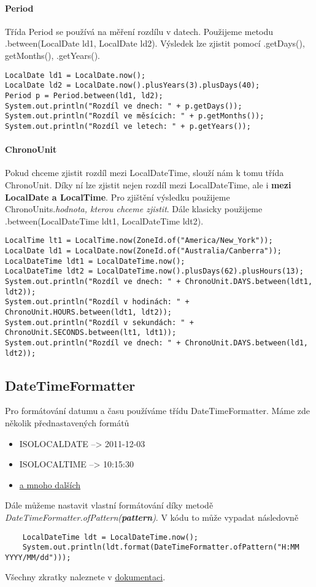 \documentclass[11pt,a4paper,titlepage]{article}
\begin{document}
\paragraph{Period}
Třída Period se používá na měření rozdílu v datech. Použijeme metodu .between(LocalDate ld1, LocalDate ld2). Výsledek lze zjistit pomocí .getDays(), getMonths(), .getYears(). \parencite{java8_period}
\begin{verbatim}
LocalDate ld1 = LocalDate.now();
LocalDate ld2 = LocalDate.now().plusYears(3).plusDays(40);
Period p = Period.between(ld1, ld2);
System.out.println("Rozdíl ve dnech: " + p.getDays());
System.out.println("Rozdíl ve měsícich: " + p.getMonths());
System.out.println("Rozdíl ve letech: " + p.getYears());
\end{verbatim}
\newpage
\paragraph{ChronoUnit}
Pokud chceme zjistit rozdíl mezi LocalDateTime, slouží nám k tomu třída ChronoUnit. Díky ní lze zjistit nejen rozdíl mezi LocalDateTime, ale i \textbf{mezi LocalDate a LocalTime}. Pro zjištění výsledku použijeme ChronoUnits.\textit{hodnota, kterou chceme zjistit}. Dále klasicky použijeme .between(LocalDateTime ldt1, LocalDateTime ldt2). \parencite{java8_chronounit}
\begin{verbatim}
LocalTime lt1 = LocalTime.now(ZoneId.of("America/New_York"));
LocalDate ld1 = LocalDate.now(ZoneId.of("Australia/Canberra"));
LocalDateTime ldt1 = LocalDateTime.now();
LocalDateTime ldt2 = LocalDateTime.now().plusDays(62).plusHours(13);
System.out.println("Rozdíl ve dnech: " + ChronoUnit.DAYS.between(ldt1, ldt2));
System.out.println("Rozdíl v hodinách: " + ChronoUnit.HOURS.between(ldt1, ldt2));
System.out.println("Rozdíl v sekundách: " + ChronoUnit.SECONDS.between(lt1, ldt1));
System.out.println("Rozdíl ve dnech: " + ChronoUnit.DAYS.between(ld1, ldt2));
\end{verbatim}
\subsection{DateTimeFormatter}
Pro formátování datumu a času používáme třídu DateTimeFormatter. Máme zde několik přednastavených formátů
\begin{itemize}
    \item ISO{\textunderscore}LOCAL{\textunderscore}DATE --> 2011-12-03
    \item ISO{\textunderscore}LOCAL{\textunderscore}TIME --> 10:15:30
    \item \href{https://docs.oracle.com/javase/8/docs/api/java/time/format/DateTimeFormatter.html#predefined}{a mnoho dalších}
\end{itemize}
Dále můžeme nastavit vlastní formátování díky metodě \textit{DateTimeFormatter.ofPattern(\textbf{pattern})}. V kódu to může vypadat následovně
\begin{verbatim}
    LocalDateTime ldt = LocalDateTime.now();
    System.out.println(ldt.format(DateTimeFormatter.ofPattern("H:MM YYYY/MM/dd")));
\end{verbatim}
Všechny zkratky naleznete v \href{https://docs.oracle.com/javase/8/docs/api/java/time/format/DateTimeFormatter.html#patterns}{dokumentaci}.
\end{document}

